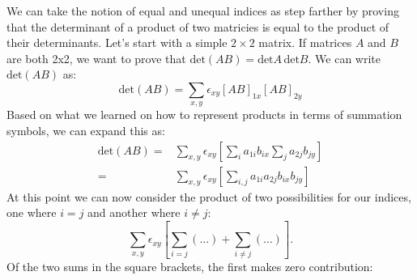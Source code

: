 We can take the notion of equal and unequal indices as step farther by proving that the determinant of a product of two matricies is equal to the product of their determinants.  Let's start with a simple $2 \times 2$ matrix.  If matrices $A$ and $B$ are both 2x2, we want to prove that $\text{det}(AB)=\text{det}A \,\text{det}B$.  We can write $\text{det}(AB)$ as:
\[
\text{det}(AB)= \sum_{x,y} \epsilon_{xy} [AB]_{1x} [AB]_{2y}
\]
Based on what we learned on how to represent products in terms of summation symbols, we can expand this as:
\begin{align*}
\text{det}(AB)=& \sum_{x,y} \epsilon_{xy} \left[ \sum_i a_{1i}b_{ix} \sum_j a_{2j}b_{jy}\right]\\
=&  \sum_{x,y} \epsilon_{xy} \left[ \sum_{i,j}  a_{1i}a_{2j} b_{ix}b_{jy}\right]
\end{align*}
At this point we can now consider the product of two possibilities for our indices, one where $i=j$ and another where $i \neq j$:
\[
 \sum_{x,y} \epsilon_{xy} \left[ \sum_{i=j}(\ldots)+\sum_{i \neq j} (\ldots) \right].
\]
Of the two sums in the square brackets, the first makes zero contribution:

